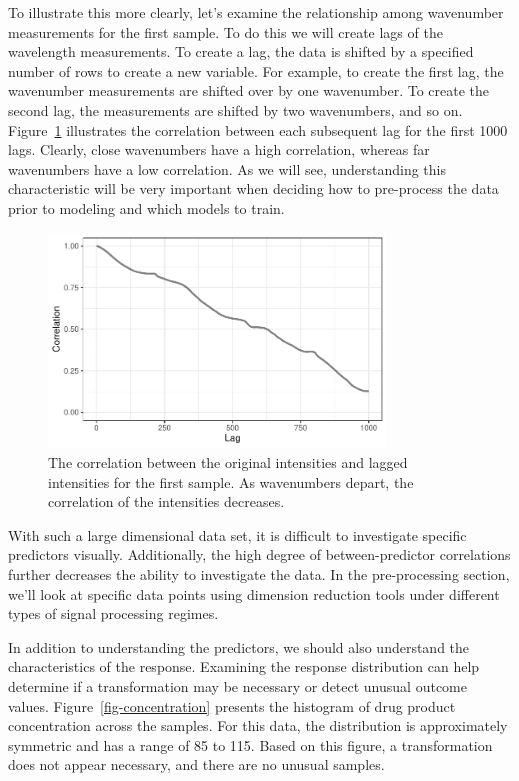 \documentclass[
  letterpaper,
  DIV=11,
  numbers=noendperiod]{scrartcl}
\begin{document}
To illustrate this more clearly, let's examine the relationship among
wavenumber measurements for the first sample. To do this we will create
lags of the wavelength measurements. To create a lag, the data is
shifted by a specified number of rows to create a new variable. For
example, to create the first lag, the wavenumber measurements are
shifted over by one wavenumber. To create the second lag, the
measurements are shifted by two wavenumbers, and so on.
Figure~\ref{fig-lagged-spectra} illustrates the correlation between each
subsequent lag for the first 1000 lags. Clearly, close wavenumbers have
a high correlation, whereas far wavenumbers have a low correlation. As
we will see, understanding this characteristic will be very important
when deciding how to pre-process the data prior to modeling and which
models to train.

\begin{figure}[t!]

{\centering \includegraphics[width=0.8\textwidth,height=\textheight]{figures/fig-lagged-spectra-1.pdf}

}

\caption{\label{fig-lagged-spectra}The correlation between the original
intensities and lagged intensities for the first sample. As wavenumbers
depart, the correlation of the intensities decreases.}

\end{figure}

With such a large dimensional data set, it is difficult to investigate
specific predictors visually. Additionally, the high degree of
between-predictor correlations further decreases the ability to
investigate the data. In the pre-processing section, we'll look at
specific data points using dimension reduction tools under different
types of signal processing regimes.

In addition to understanding the predictors, we should also understand
the characteristics of the response. Examining the response distribution
can help determine if a transformation may be necessary or detect
unusual outcome values. Figure~\ref{fig-concentration} presents the
histogram of drug product concentration across the samples. For this
data, the distribution is approximately symmetric and has a range of 85
to 115. Based on this figure, a transformation does not appear
necessary, and there are no unusual samples.
\end{document}
